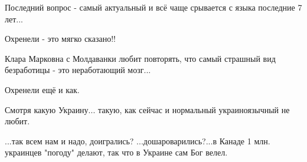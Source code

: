 \begin{itemize}
 
Последний вопрос - самый актуальный и всё чаще срывается с языка последние 7 лет...

 
Охренели - это мягко сказано!!

 
Клара Марковна с Молдаванки любит повторять, что самый страшный вид безработицы - это неработающий мозг...

 
Охренели ещё и как.

 
Смотря какую Украину... такую, как сейчас и нормальный украиноязычный не любит.

 
...так всем нам и надо, доигрались? ...дошароварились?...в Канаде 1 млн. украинцев "погоду" делают, так что в Украине сам Бог велел.

 

\end{itemize}
